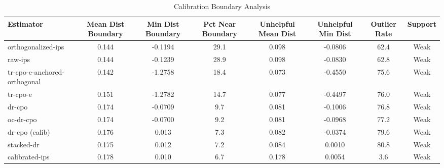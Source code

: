 \begin{table}[htbp]
\centering
\caption{Calibration Boundary Analysis}
\label{tab:A5}
\begin{tabular}{l|ccccccc}
\toprule
Estimator & Mean Dist Boundary & Min Dist Boundary & Pct Near Boundary & Unhelpful Mean Dist & Unhelpful Min Dist & Outlier Rate & Support \\
\midrule
orthogonalized-ips & 0.144 & -0.1194 & 29.1 & 0.098 & -0.0806 & 62.4 & Weak \\
raw-ips & 0.144 & -0.1239 & 28.9 & 0.098 & -0.0830 & 62.8 & Weak \\
tr-cpo-e-anchored-orthogonal & 0.142 & -1.2758 & 18.4 & 0.073 & -0.4550 & 75.6 & Weak \\
tr-cpo-e & 0.151 & -1.2782 & 14.7 & 0.077 & -0.4497 & 76.0 & Weak \\
dr-cpo & 0.174 & -0.0709 & 9.7 & 0.081 & -0.1006 & 76.8 & Weak \\
oc-dr-cpo & 0.174 & -0.0700 & 9.2 & 0.081 & -0.0968 & 77.2 & Weak \\
dr-cpo (calib) & 0.176 & 0.013 & 7.3 & 0.082 & -0.0374 & 79.6 & Weak \\
stacked-dr & 0.175 & 0.012 & 7.2 & 0.084 & 0.0010 & 80.8 & Weak \\
calibrated-ips & 0.178 & 0.010 & 6.7 & 0.178 & 0.0054 & 3.6 & Weak \\
\bottomrule
\end{tabular}
\end{table}